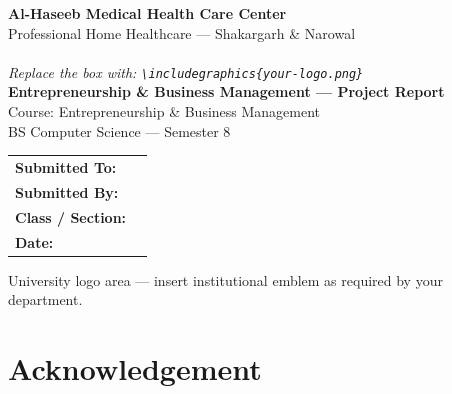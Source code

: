 \documentclass[12pt,a4paper]{report}
\begin{document}
\begin{titlepage}
\centering
\vspace*{1cm}

{\Large \textbf{Al-Haseeb Medical Health Care Center}}\\[0.35cm]
{\large Professional Home Healthcare --- Shakargarh \& Narowal}\\[1.2cm]

\\[0.5cm]
{\small \textit{Replace the box with: \texttt{\textbackslash includegraphics\{your-logo.png\}}}}\\[1.5cm]

{\large \textbf{Entrepreneurship \& Business Management --- Project Report}}\\[0.6cm]
{\normalsize Course: Entrepreneurship \& Business Management}\\[0.3cm]
{\normalsize BS Computer Science --- Semester 8}\\[2cm]

\begin{tabular}{ll}
\textbf{Submitted To:}    & \underline{\hspace{6cm}} \\[0.8cm]
\textbf{Submitted By:}    & \underline{\hspace{6cm}} \\[0.8cm]
\textbf{Class / Section:} & \underline{\hspace{6cm}} \\[0.8cm]
\textbf{Date:}            & \underline{\hspace{6cm}} \\
\end{tabular}

\vfill
{\small University logo area --- insert institutional emblem as required by your department.}\\[0.5cm]
\end{titlepage}

\thispagestyle{empty}


\chapter*{Acknowledgement}
\end{document}
